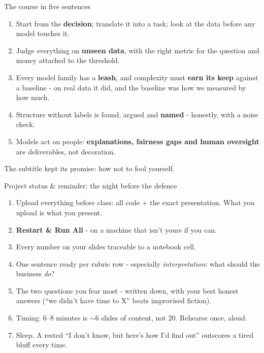 \documentclass[10pt,aspectratio=169]{beamer}
\begin{document}
\begin{frame}{The course in five sentences}
  \begin{enumerate}
    \item Start from the \textbf{decision}; translate it into a task; look
          at the data before any model touches it.
    \item Judge everything on \textbf{unseen data}, with the right metric
          for the question and money attached to the threshold.
    \item Every model family has a \textbf{leash}, and complexity must
          \textbf{earn its keep} against a baseline - on real data it
          did, and the baseline was how we measured by how much.
    \item Structure without labels is found, argued and \textbf{named} -
          honestly, with a noise check.
    \item Models act on people: \textbf{explanations, fairness gaps and
          human oversight} are deliverables, not decoration.
  \end{enumerate}
  \vspace{0.5em}
  \begin{center}
    The subtitle kept its promise: \alert{how not to fool yourself.}
  \end{center}
\end{frame}

\begin{frame}{Project status \& reminder: the night before the defence}
  \begin{enumerate}
    \item \alert{Upload everything before class}: all code + the exact
          presentation. What you upload is what you present.
    \item \textbf{Restart \& Run All} - on a machine that isn't yours if
          you can.
    \item Every number on your slides \alert{traceable} to a notebook
          cell.
    \item One sentence ready per rubric row - especially
          \emph{interpretation}: what should the business \emph{do}?
    \item The two questions you fear most - written down, with your best
          honest answers (``we didn't have time to X'' beats improvised
          fiction).
    \item Timing: 6--8 minutes is \alert{$\sim$6 slides of content}, not 20.
          Rehearse once, aloud.
    \item Sleep. A rested ``I don't know, but here's how I'd find out''
          outscores a tired bluff every time.
  \end{enumerate}
\end{frame}
\end{document}
